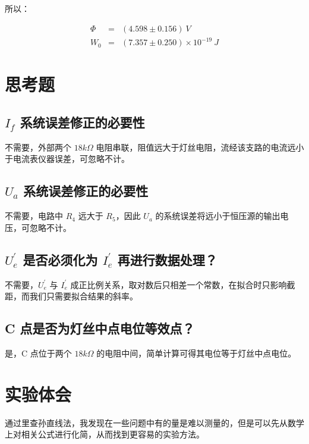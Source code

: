 \documentclass[a4paper]{article}
\begin{document}
\par 所以：

$$
\begin{array}{rcl}
	\Phi&=&(4.598\pm 0.156)\ V\\
	W_0&=&(7.357\pm 0.250)\times 10^{-19}\ J
\end{array}
$$

\section{思考题}

\subsection{$I_f$ 系统误差修正的必要性}

\par 不需要，外部两个 $18k\Omega$ 电阻串联，阻值远大于灯丝电阻，流经该支路的电流远小于电流表仪器误差，可忽略不计。

\subsection{$U_a$ 系统误差修正的必要性}

\par 不需要，电路中 $R_4$ 远大于 $R_5$，因此 $U_a$ 的系统误差将远小于恒压源的输出电压，可忽略不计。

\subsection{$U_e^\prime$ 是否必须化为 $I_e^\prime$ 再进行数据处理？}

\par 不需要，$U_e^\prime$ 与 $I_e^\prime$ 成正比例关系，取对数后只相差一个常数，在拟合时只影响截距，而我们只需要拟合结果的斜率。

\subsection{C 点是否为灯丝中点电位等效点？}

\par 是，C 点位于两个 $18k\Omega$ 的电阻中间，简单计算可得其电位等于灯丝中点电位。

\section{实验体会}

\par 通过里查孙直线法，我发现在一些问题中有的量是难以测量的，但是可以先从数学上对相关公式进行化简，从而找到更容易的实验方法。
\end{document}
